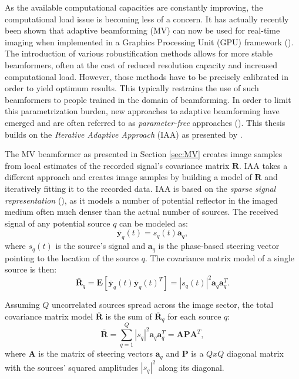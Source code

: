 As the available computational capacities are constantly improving, the computational load issue is becoming less of a concern. It has actually recently been shown that adaptive beamforming (MV) can now be used for real-time imaging when implemented in a Graphics Processing Unit (GPU) framework (\cite{GPU}).
The introduction of various robustification methods allows for more stable beamformers, often at the cost of reduced resolution capacity and increased computational load. However, those methods have to be precisely calibrated in order to yield optimum results. This typically restrains the use of such beamformers to people trained in the domain of beamforming.
In order to limit this parametrization burden, new approaches to adaptive beamforming have emerged and are often referred to as \textit{parameter-free} approaches (\cite{Yardibi_nonparametric_IAA, Yardibi, Du_parameter_free, Jensen_IAA}). This thesis builds on the \textit{Iterative Adaptive Approach} (IAA) as presented by \cite{Jensen_IAA}.

The MV beamformer as presented in Section \ref{sec:MV} creates image samples from local estimates of the recorded signal's covariance matrix $\boldsymbol{R}$.
IAA takes a different approach and creates image samples by building a model of $\boldsymbol{R}$ and iteratively fitting it to the recorded data.
IAA is based on the \textit{sparse signal representation} (\cite{Yardibi_nonparametric_IAA}), as it models a number of potential reflector in the imaged medium often much denser than the actual number of sources. The received signal of any potential source $q$ can be modeled as:
\begin{equation}
    \boldsymbol{\bar{y}}_q(t) = s_q(t)  \boldsymbol{a}_q,
\end{equation}
\noindent
where $s_q(t)$ is the source's signal and $\boldsymbol{a}_q$ is the phase-based steering vector pointing to the location of the source $q$. The covariance matrix model of a single source is then:
\begin{equation}
    \boldsymbol{\bar{R}}_q = \boldsymbol{E}[\boldsymbol{\bar{y}}_q(t) \boldsymbol{\bar{y}}_q(t)^T] = |s_q(t)|^2 \boldsymbol{a}_q \boldsymbol{a}_q^T.
\end{equation}

\noindent
Assuming $Q$ uncorrelated sources spread across the image sector, the total covariance matrix model $\boldsymbol{\bar{R}}$ is the sum of $\boldsymbol{\bar{R}}_q$ for each source $q$:
\begin{equation}
    \boldsymbol{\bar{R}} = \sum_{q=1}^{Q} |s_q|^2 \boldsymbol{a}_q \boldsymbol{a}_q^T = \boldsymbol{A} \boldsymbol{P} \boldsymbol{A}^T,
\label{eq:R_IAA}
\end{equation}
\noindent
where $\boldsymbol{A}$ is the matrix of steering vectors $\boldsymbol{a}_q$ and $\boldsymbol{P}$ is a $Q x Q$ diagonal matrix with the sources' squared amplitudes $|s_q|^2$ along its diagonal.

